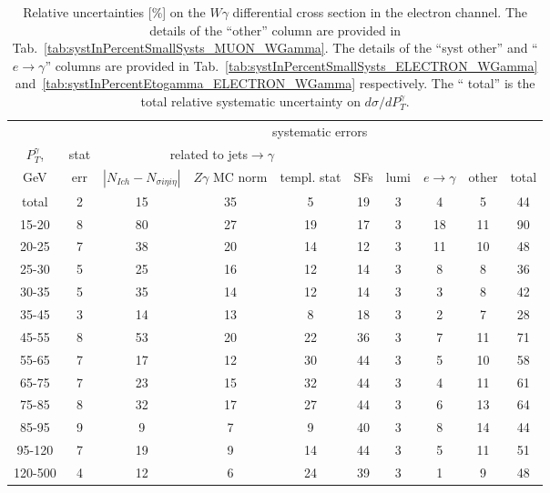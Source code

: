 \begin{table}[h]
  \scriptsize
  \begin{center}
  \caption{Relative uncertainties [\%] on the $W\gamma$ differential cross section in the electron channel. The details of the ``other'' column are provided in Tab.~\ref{tab:systInPercentSmallSysts_MUON_WGamma}. The details of the ``syst other'' and ``$e\rightarrow\gamma$'' columns are provided in Tab.~\ref{tab:systInPercentSmallSysts_ELECTRON_WGamma} and~\ref{tab:systInPercentEtogamma_ELECTRON_WGamma} respectively. The `` total'' is the total relative systematic uncertainty on $d\sigma/dP_T^{\gamma}$.}
   \begin{tabular}{|c|c|c|c|c|c|c|c|c|c|}
                   &     & \multicolumn{8}{|c|}{systematic errors}     \\
    $P_T^{\gamma}$,  & stat & \multicolumn{3}{|c|}{related to jets$\rightarrow\gamma$} &  &  &  &  & \\
    GeV           & err & $|N_{Ich}-N_{\sigma{i\eta i\eta}}|$ &$Z\gamma$ MC norm &templ. stat & SFs & lumi & $e\rightarrow\gamma$  & other & total\\ \hline
    total  & 2 & 15 & 35 & 5 & 19 & 3 & 4 & 5 & 44 \\ \hline
    15-20 & 8 & 80 & 27 & 19 & 17 & 3 & 18 & 11 & 90 \\ \hline
    20-25 & 7 & 38 & 20 & 14 & 12 & 3 & 11 & 10 & 48 \\ \hline
    25-30 & 5 & 25 & 16 & 12 & 14 & 3 & 8 & 8 & 36 \\ \hline
    30-35 & 5 & 35 & 14 & 12 & 14 & 3 & 3 & 8 & 42 \\ \hline
    35-45 & 3 & 14 & 13 & 8 & 18 & 3 & 2 & 7 & 28 \\ \hline
    45-55 & 8 & 53 & 20 & 22 & 36 & 3 & 7 & 11 & 71 \\ \hline
    55-65 & 7 & 17 & 12 & 30 & 44 & 3 & 5 & 10 & 58 \\ \hline
    65-75 & 7 & 23 & 15 & 32 & 44 & 3 & 4 & 11 & 61 \\ \hline
    75-85 & 8 & 32 & 17 & 27 & 44 & 3 & 6 & 13 & 64 \\ \hline
    85-95 & 9 & 9 & 7 & 9 & 40 & 3 & 8 & 14 & 44 \\ \hline
    95-120 & 7 & 19 & 9 & 14 & 44 & 3 & 5 & 11 & 51 \\ \hline
    120-500 & 4 & 12 & 6 & 24 & 39 & 3 & 1 & 9 & 48 \\ \hline
  \end{tabular}
  \label{tab:systInPercent_ELECTRON_WGamma}
  \end{center}
\end{table}

